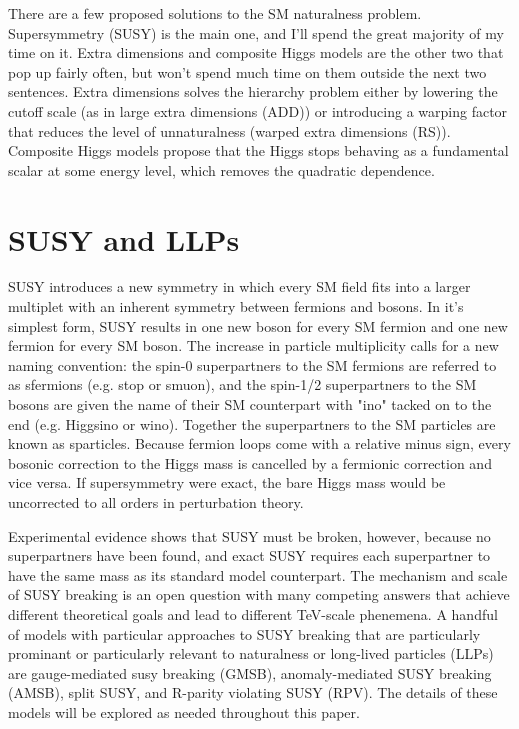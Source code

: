 \documentclass[12pt]{article}
\begin{document}
    There are a few proposed solutions to the SM naturalness problem. Supersymmetry (SUSY) is the main one, and I'll spend the great majority of my time on it. Extra dimensions and composite Higgs models are the other two that pop up fairly often, but won't spend much time on them outside the next two sentences. Extra dimensions solves the hierarchy problem either by lowering the cutoff scale (as in large extra dimensions (ADD)) or introducing a warping factor that reduces the level of unnaturalness (warped extra dimensions (RS)). Composite Higgs models propose that the Higgs stops behaving as a fundamental scalar at some energy level, which removes the quadratic dependence.
    
\section{SUSY and LLPs}
    SUSY introduces a new symmetry in which every SM field fits into a larger multiplet with an inherent symmetry between fermions and bosons. In it's simplest form, SUSY results in one new boson for every SM fermion and one new fermion for every SM boson. The increase in particle multiplicity calls for a new naming convention: the spin-0 superpartners to the SM fermions are referred to as sfermions (e.g. stop or smuon), and the spin-1/2 superpartners to the SM bosons are given the name of their SM counterpart with "ino" tacked on to the end (e.g. Higgsino or wino). Together the superpartners to the SM particles are known as sparticles. Because fermion loops come with a relative minus sign, every bosonic correction to the Higgs mass is cancelled by a fermionic correction and vice versa. If supersymmetry were exact, the bare Higgs mass would be uncorrected to all orders in perturbation theory.

    Experimental evidence shows that SUSY must be broken, however, because no superpartners have been found, and exact SUSY requires each superpartner to have the same mass as its standard model counterpart. The mechanism and scale of SUSY breaking is an open question with many competing answers that achieve different theoretical goals and lead to different TeV-scale phenemena. A handful of models with particular approaches to SUSY breaking that are particularly prominant or particularly relevant to naturalness or long-lived particles (LLPs) are gauge-mediated susy breaking (GMSB), anomaly-mediated SUSY breaking (AMSB), split SUSY, and R-parity violating SUSY (RPV). The details of these models will be explored as needed throughout this paper.
\end{document}
